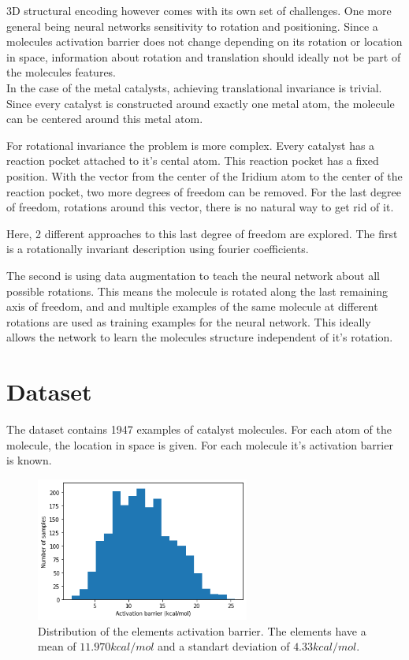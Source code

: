 3D structural encoding however comes with its own set of challenges. 
One more general being neural networks sensitivity to rotation and positioning.
Since a molecules activation barrier does not change depending on its rotation or location in space, 
information about rotation and translation should ideally not be part of the molecules features.
\\
In the case of the metal catalysts, achieving translational invariance is trivial.
Since every catalyst is constructed around exactly one metal atom, the molecule can be centered around this metal atom.

For rotational invariance the problem is more complex.
Every catalyst has a reaction pocket attached to it's cental atom.
This reaction pocket has a fixed position.
With the vector from the center of the Iridium atom to the center of the reaction pocket, two more degrees of freedom can be removed.
For the last degree of freedom, rotations around this vector, there is no natural way to get rid of it.

Here, 2 different approaches to this last degree of freedom are explored.
The first is a rotationally invariant description using fourier coefficients.

The second is using data augmentation to teach the neural network about all possible rotations.
This means the molecule is rotated along the last remaining axis of freedom, and and multiple examples of the same molecule at different rotations are used as training examples for the neural network.
This ideally allows the network to learn the molecules structure independent of it's rotation.


\section{Dataset}

The dataset contains 1947 examples of catalyst molecules.
For each atom of the molecule, the location in space is given.
For each molecule it's activation barrier is known.

\begin{figure}
  \centering
  \includegraphics[width=7cm]{figures/introduction/barrier.png}
  \caption{Distribution of the elements activation barrier. The elements have a mean of $11.970 kcal/mol$ and a standart deviation of $4.33 kcal/mol$.}
  \label{fig:barriers}
\end{figure}

